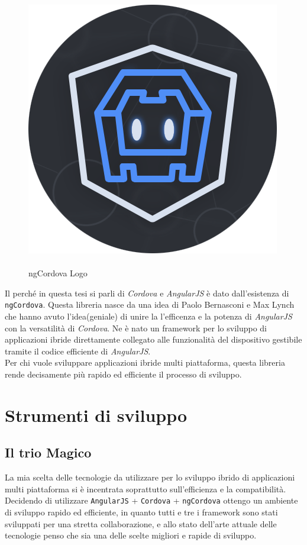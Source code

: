 \begin{figure}
  \vspace{-65pt}
  \begin{center}
    \includegraphics[scale=0.35]{Figures/ngcordova-logo.png}
  \end{center}
  \vspace{-10pt}
  \caption{\\ngCordova Logo}
  \label{fig:ngCordova}
  \vspace{0pt}
\end{figure}

Il perché in questa tesi si parli di \emph{Cordova} e \emph{AngularJS} è dato dall'esistenza di \texttt{ngCordova}. Questa libreria nasce da una idea di Paolo Bernasconi e Max Lynch che hanno avuto l'idea(geniale) di unire la l'efficenza e la potenza di \emph{AngularJS} con la versatilità di \emph{Cordova}. Ne è nato un framework per lo sviluppo di applicazioni ibride direttamente collegato alle funzionalità del dispositivo gestibile tramite il codice efficiente di \emph{AngularJS}.\\
Per chi vuole sviluppare applicazioni ibride multi piattaforma, questa libreria rende decisamente più rapido ed efficiente il processo di sviluppo.

\section{Strumenti di sviluppo}

\subsection{Il trio Magico}
La mia scelta delle tecnologie da utilizzare per lo sviluppo ibrido di applicazioni multi piattaforma si è incentrata soprattutto sull'efficienza e la compatibilità. Decidendo di utilizzare \texttt{AngularJS} + \texttt{Cordova} + \texttt{ngCordova} ottengo un ambiente di sviluppo rapido ed efficiente, in quanto tutti e tre i framework sono stati sviluppati per una stretta collaborazione, e allo stato dell'arte attuale delle tecnologie penso che sia una delle scelte migliori e rapide di sviluppo.

